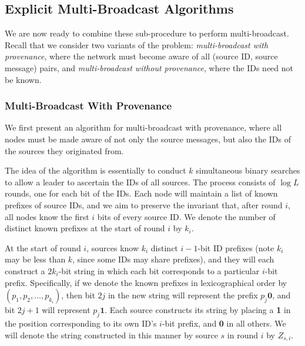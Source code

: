 \documentclass{article}
\begin{document}
\subsection{Explicit Multi-Broadcast Algorithms}

We are now ready to combine these sub-procedure to perform multi-broadcast. Recall that we consider two variants of the problem: \emph{multi-broadcast with provenance}, where the network must become aware of all (source ID, source message) pairs, and \emph{multi-broadcast without provenance}, where the IDs need not be known. 

\subsubsection{Multi-Broadcast With Provenance}

We first present an algorithm for multi-broadcast with provenance, where all nodes must be made aware of not only the source messages, but also the IDs of the sources they originated from.

The idea of the algorithm is essentially to conduct $k$ simultaneous binary searches to allow a leader to ascertain the IDs of all sources. The process consists of $\log L$ rounds, one for each bit of the IDs. Each node will maintain a list of known prefixes of source IDs, and we aim to preserve the invariant that, after round $i$, all nodes know the first $i$ bits of every source ID. We denote the number of distinct known prefixes at the start of round $i$ by $k_i$.

At the start of round $i$, sources know $k_{i}$ distinct $i-1$-bit ID prefixes (note $k_{i}$ may be less than $k$, since some IDs may share prefixes), and they will each construct a $2k_{i}$-bit string in which each bit corresponds to a particular $i$-bit prefix. Specifically, if we denote the known prefixes in lexicographical order by $(p_1,p_2,\dots , p_{k_{i}})$, then bit $2j$ in the new string will represent the prefix $p_j\textbf{0}$, and bit $2j+1$ will represent $p_j\textbf{1}$. Each source constructs its string by placing a \textbf{1} in the position corresponding to its own ID's $i$-bit prefix, and \textbf{0} in all others. We will denote the string constructed in this manner by source $s$ in round $i$ by $Z_{s,i}$.
\end{document}

